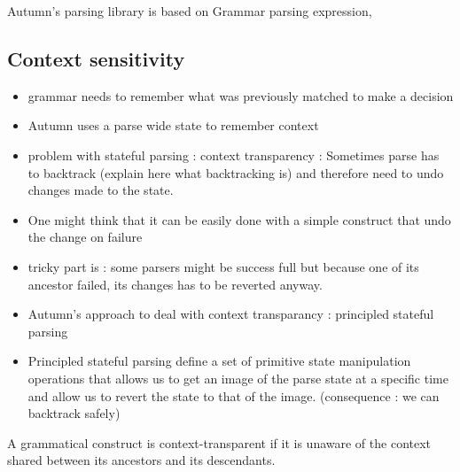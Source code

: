 Autumn's parsing library is based on Grammar parsing expression, 
    
      

	\subsection{Context sensitivity}

	\begin{itemize}
		\item grammar needs to remember what was previously matched to make a decision
		\item Autumn uses a parse wide state to remember context
		\item problem with stateful parsing : context transparency : Sometimes parse has to backtrack (explain here what backtracking is) and therefore need to undo changes made to the state.
		\item One might think that it can be easily done with a simple construct that undo the change on failure
		\item tricky part is : some parsers might be success full but because one of its ancestor failed, its changes has to be reverted anyway.
		\item Autumn's approach to deal with context transparancy : principled stateful parsing
		\item Principled stateful parsing define a set of primitive state manipulation operations that allows us to get an image of the parse state at a specific time and allow us to revert the state to that of the image. (consequence : we can backtrack safely)
	\end{itemize}

	A grammatical construct is context-transparent if it is unaware of the context shared between its ancestors and its descendants.
	
